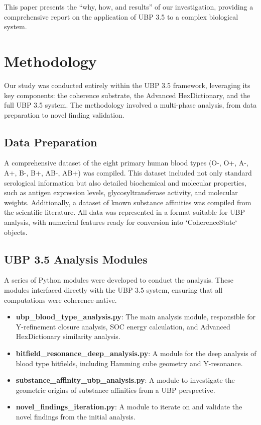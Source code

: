\documentclass{article}
\begin{document}
This paper presents the ``why, how, and results'' of our investigation, providing a comprehensive report on the application of UBP 3.5 to a complex biological system.

\section{Methodology}

Our study was conducted entirely within the UBP 3.5 framework, leveraging its key components: the coherence substrate, the Advanced HexDictionary, and the full UBP 3.5 system. The methodology involved a multi-phase analysis, from data preparation to novel finding validation.

\subsection{Data Preparation}

A comprehensive dataset of the eight primary human blood types (O-, O+, A-, A+, B-, B+, AB-, AB+) was compiled. This dataset included not only standard serological information but also detailed biochemical and molecular properties, such as antigen expression levels, glycosyltransferase activity, and molecular weights. Additionally, a dataset of known substance affinities was compiled from the scientific literature. All data was represented in a format suitable for UBP analysis, with numerical features ready for conversion into `CoherenceState` objects.

\subsection{UBP 3.5 Analysis Modules}

A series of Python modules were developed to conduct the analysis. These modules interfaced directly with the UBP 3.5 system, ensuring that all computations were coherence-native.

\begin{itemize}
    \item \textbf{ubp\_blood\_type\_analysis.py}: The main analysis module, responsible for Y-refinement closure analysis, SOC energy calculation, and Advanced HexDictionary similarity analysis.
    \item \textbf{bitfield\_resonance\_deep\_analysis.py}: A module for the deep analysis of blood type bitfields, including Hamming cube geometry and Y-resonance.
    \item \textbf{substance\_affinity\_ubp\_analysis.py}: A module to investigate the geometric origins of substance affinities from a UBP perspective.
    \item \textbf{novel\_findings\_iteration.py}: A module to iterate on and validate the novel findings from the initial analysis.
\end{itemize}
\end{document}
